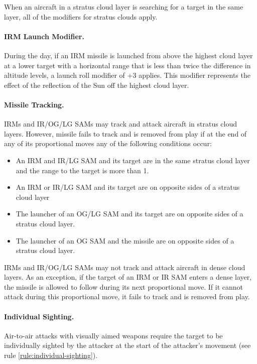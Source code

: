 \begin{advancedrules}
{When an aircraft in a stratus cloud layer is searching for a target in the same layer, all of the  modifiers for stratus clouds apply.

\paragraph{IRM Launch Modifier.} During the day, if an IRM missile is launched from above the highest cloud layer at a lower target with a horizontal range that is less than twice the difference in altitude levels, a launch roll modifier of $+3$ applies. This modifier represents the effect of the reflection of the Sun off the highest cloud layer.

\paragraph{Missile Tracking.} IRMs and IR/OG/LG SAMs may track and attack aircraft in stratus cloud layers. However, missile fails to track and is removed from play if at the end of any of its proportional moves any of the following conditions occur:

\begin{itemize}
\item An IRM and IR/LG SAM and its target are in the same stratus cloud layer and the range to the target is more than 1.
\item An IRM or IR/LG SAM and its target are on opposite sides of a stratus cloud layer
\item The launcher of an OG/LG SAM and its target are on opposite sides of a stratus cloud layer.
\item The launcher of an OG SAM and the missile are on opposite sides of a stratus cloud layer.
\end{itemize}

IRMs and IR/OG/LG SAMs may not track and attack aircraft in dense cloud layers. As an exception, if the target of an IRM or IR SAM enters a dense layer, the missile is allowed to follow during its next proportional move. If it cannot attack during this proportional move, it fails to track and is removed from play.

\paragraph{Individual Sighting.} Air-to-air attacks with visually aimed weapons require the target to be individually sighted by the attacker at the start of the attacker's movement (see rule \ref{rule:individual-sighting}). 

}
\end{advancedrules}
